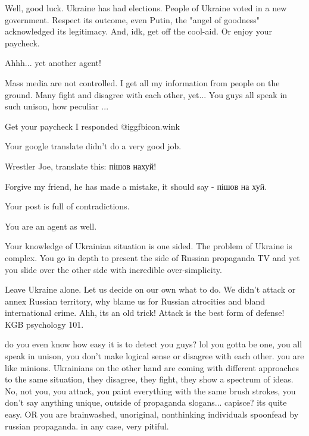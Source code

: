 \begin{itemize}
\begin{itemize}
Well, good luck. Ukraine has had elections. People of Ukraine voted in a new
government. Respect its outcome, even Putin, the "angel of goodness"
acknowledged its legitimacy. And, idk, get off the cool-aid. Or enjoy your
paycheck.


Ahhh... yet another agent!


Mass media are not controlled. I get all my information from people on the
ground. Many fight and disagree with each other, yet... You guys all speak in
such unison, how peculiar ...

Get your paycheck I responded  @igg{fbicon.wink} 

Your google translate didn't do a very good job.

Wrestler Joe, translate this: пішов нахуй!

Forgive my friend, he has made a mistake, it should say - пішов на хуй.


Your post is full of contradictions.

You are an agent as well.

Your knowledge of Ukrainian situation is one sided. The problem of Ukraine is
complex. You go in depth to present the side of Russian propaganda TV and yet
you slide over the other side with incredible over-simplicity.

Leave Ukraine alone. Let us decide on our own what to do. We didn't attack or
annex Russian territory, why blame us for Russian atrocities and bland
international crime. Ahh, its an old trick! Attack is the best form of defense!
KGB psychology 101.


do you even know how easy it is to detect you guys? lol you gotta be one, you
all speak in unison, you don't make logical sense or disagree with each other.
you are like minions. Ukrainians on the other hand are coming with different
approaches to the same situation, they disagree, they fight, they show a
spectrum of ideas. No, not you, you attack, you paint everything with the same
brush strokes, you don't say anything unique, outside of propaganda slogans...
capisce? its quite easy. OR you are brainwashed, unoriginal, nonthinking
individuals spoonfead by russian propaganda. in any case, very pitiful.



\end{itemize}
\end{itemize}
